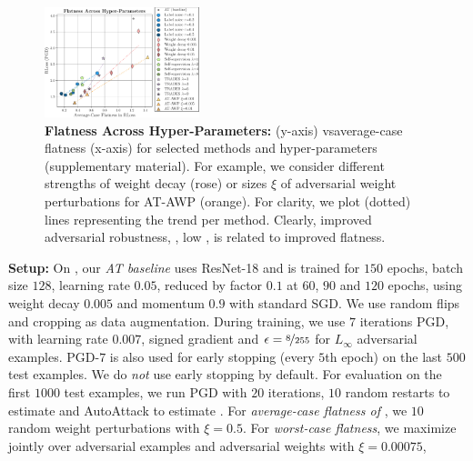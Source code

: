 \begin{figure}[t]
	\centering
	\vspace*{-0.2cm}
	\includegraphics[width=0.4\textwidth]{plots_main_flatness_methods}
	\vspace*{-6px}
	\caption{\textbf{Flatness Across Hyper-Parameters:} \RCE (y-axis) vs\onedot average-case flatness (x-axis) for selected methods and hyper-parameters (\cf supplementary material). For example, we consider different strengths of weight decay ({\color{plot2}rose}) or sizes $\xi$ of adversarial weight perturbations for AT-AWP ({\color{plot10!80!black}orange}). For clarity, we plot (dotted) lines representing the trend per method. Clearly, improved adversarial robustness, \ie, low \RCE, is related to improved flatness.}
	\label{fig:experiments-flatness-methods}
	\vspace*{-6px}
\end{figure}

\textbf{Setup:} 
%
On \CifarT \cite{Krizhevsky2009}, our \emph{AT baseline} uses ResNet-18 \cite{HeCVPR2016} and is trained for $150$ epochs, batch size $128$, learning rate $0.05$, reduced by factor $0.1$ at $60$, $90$ and $120$ epochs, using weight decay $0.005$ and momentum $0.9$ with standard SGD. We use random flips and cropping as data augmentation. During training, we use $7$ iterations PGD, with learning rate $0.007$, signed gradient and $\epsilon = \nicefrac{8}{255}$ for $L_\infty$ adversarial examples. PGD-$7$ is also used for early stopping (every $5$th epoch) on the last $500$ test examples. We do \emph{not} use early stopping by default. For evaluation on the first $1000$ test examples, we run PGD with $20$ iterations, $10$ random restarts to estimate \RCE and AutoAttack \cite{CroceICML2020} to estimate \RTE\xspace{}. For \emph{average-case flatness of \RCE}, we  $10$ random weight perturbations with $\xi{=}0.5$. For \emph{worst-case flatness}, we maximize \RCE jointly over adversarial examples and adversarial weights with $\xi{=}0.00075$, 
 
